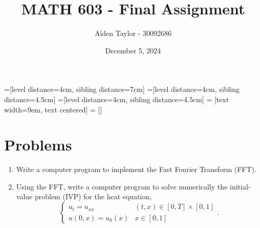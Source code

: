 \documentclass[11pt]{article}
\title{MATH 603 - Final Assignment}
\author{Aiden Taylor - 30092686}
\date{December 5, 2024}
\begin{document}
=[level distance=4cm, sibling distance=7cm]
=[level distance=4cm, sibling distance=4.5cm]
=[level distance=4cm, sibling distance=4.5cm]
 = [text width=9em, text centered]
 = []
\maketitle
\newpage
\tableofcontents
\newpage
\section{Problems}
	\begin{enumerate}[1.]
		\item Write a computer program to implement the Fast Fourier Transform (FFT).
	\item Using the FFT, write a computer program to solve numerically
		the initial-value problem (IVP) for the heat equation,
			\[
		\begin{cases}
			u_t = u_{xx} & (t,x) \in [0,T] \times [0,1] \\
			u(0,x) = u_0(x) & x \in [0,1]
		\end{cases}.
			\]
	\end{enumerate}
\newpage
\end{document}
